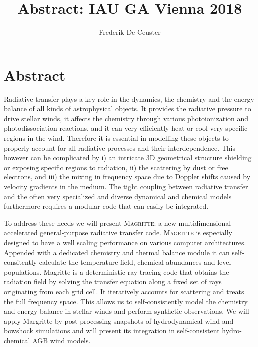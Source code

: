 \documentclass[]{article}
\title{Abstract: IAU GA Vienna 2018}
\author{Frederik De Ceuster}
\date{}
\begin{document}
\section*{Abstract}

	Radiative transfer plays a key role in the dynamics, the chemistry and the energy balance of all kinds of astrophysical objects. It provides the radiative pressure to drive stellar winds, it affects the chemistry through various photoionization and photodissociation reactions, and it can very efficiently heat or cool very specific regions in the wind. Therefore it is essential in modelling these objects to properly account for all radiative processes and their interdependence. This however can be complicated by i) an intricate 3D geometrical structure shielding or exposing specific regions to radiation, ii) the scattering by dust or free electrons, and iii) the mixing in frequency space due to Doppler shifts caused by velocity gradients in the medium. The tight coupling between radiative transfer and the often very specialized and diverse dynamical and chemical models furthermore requires a modular code that can easily be integrated.

  \bigskip

  To address these needs we will present \textsc{Magritte}: a new multidimensional accelerated general-purpose radiative transfer code. \textsc{Magritte} is especially designed to have a well scaling performance on various computer architectures.  Appended with a dedicated chemistry and thermal balance module it can self-consitently calculate the temperature field, chemical abundances and level populations. Magritte is a deterministic ray-tracing code that obtains the radiation field by solving the transfer equation along a fixed set of rays originating from each grid cell. It iteratively accounts for scattering and treats the full frequency space. This allows us to self-consistently model the chemistry and energy balance in stellar winds and perform synthetic observations. We will apply {\sc Margritte} by post-processing snapshots of hydrodynamical wind and bowshock simulations and will present its integration in self-consistent hydro-chemical AGB wind models.
\end{document}
